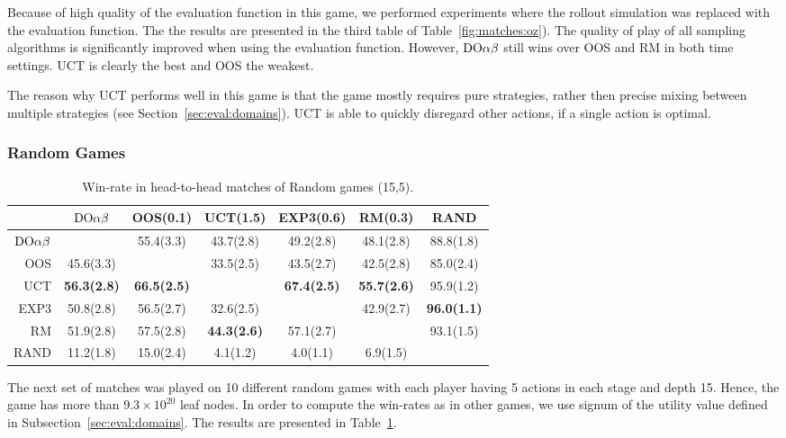 Because of high quality of the evaluation function in this game, we performed experiments where the rollout simulation was replaced with the evaluation function.
The the results are presented in the third table of Table~\ref{fig:matches:oz}).
The quality of play of all sampling algorithms is significantly improved when using the evaluation function.
However, $\textrm{DO}\alpha\beta$ still wins over OOS and RM in both time settings.
UCT is clearly the best and OOS the weakest.

The reason why UCT performs well in this game is that the game mostly requires pure strategies, rather then precise mixing between multiple strategies (see Section~\ref{sec:eval:domains}). UCT is able to quickly disregard other actions, if a single action is optimal.

\subsubsection{Random Games}

\begin{table}
\centering
\begin{scriptsize}

\begin{tabular}{|r|cccccc|}\hline
&$\textrm{DO}\alpha\beta$&OOS(0.1)&UCT(1.5)&EXP3(0.6)&RM(0.3)&RAND\\\hline
$\textrm{DO}\alpha\beta$&&55.4(3.3)&43.7(2.8)&49.2(2.8)&48.1(2.8)&88.8(1.8)\\
OOS&45.6(3.3)&&33.5(2.5)&43.5(2.7)&42.5(2.8)&85.0(2.4)\\
UCT&\textbf{56.3(2.8)}&\textbf{66.5(2.5)}&&\textbf{67.4(2.5)}&\textbf{55.7(2.6)}&95.9(1.2)\\
EXP3&50.8(2.8)&56.5(2.7)&32.6(2.5)&&42.9(2.7)&\textbf{96.0(1.1)}\\
RM&51.9(2.8)&57.5(2.8)&\textbf{44.3(2.6)}&57.1(2.7)&&93.1(1.5)\\
RAND&11.2(1.8)&15.0(2.4)&4.1(1.2)&4.0(1.1)&6.9(1.5)&\\
\hline
\end{tabular}


\end{scriptsize}
\caption{Win-rate in head-to-head matches of Random games (15,5).}\label{fig:matches:rand}
\end{table}


The next set of matches was played on 10 different random games with each player having 5 actions in each stage and depth 15. Hence, the game has more than $9.3\times 10^{20}$ leaf nodes. In order to compute the win-rates as in other games, we use signum of the utility value defined in Subsection~\ref{sec:eval:domains}. The results are presented in Table~\ref{fig:matches:rand}.

